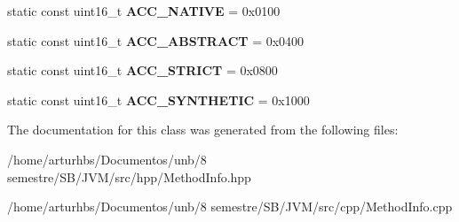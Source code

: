 \begin{DoxyCompactItemize}
\item 
static const uint16\+\_\+t {\bfseries A\+C\+C\+\_\+\+N\+A\+T\+I\+VE} = 0x0100\hypertarget{classMethodInfo_a5be7aad6dd747cb60a059aff7f6bf14c}{}\label{classMethodInfo_a5be7aad6dd747cb60a059aff7f6bf14c}

\item 
static const uint16\+\_\+t {\bfseries A\+C\+C\+\_\+\+A\+B\+S\+T\+R\+A\+CT} = 0x0400\hypertarget{classMethodInfo_a220d90f2bc05772aed488b598ec54d94}{}\label{classMethodInfo_a220d90f2bc05772aed488b598ec54d94}

\item 
static const uint16\+\_\+t {\bfseries A\+C\+C\+\_\+\+S\+T\+R\+I\+CT} = 0x0800\hypertarget{classMethodInfo_a83b3d5b0225d1a35d90f5fe3571e7a59}{}\label{classMethodInfo_a83b3d5b0225d1a35d90f5fe3571e7a59}

\item 
static const uint16\+\_\+t {\bfseries A\+C\+C\+\_\+\+S\+Y\+N\+T\+H\+E\+T\+IC} = 0x1000\hypertarget{classMethodInfo_adbdfc13db237a1860763d0f795bdf2d0}{}\label{classMethodInfo_adbdfc13db237a1860763d0f795bdf2d0}

\end{DoxyCompactItemize}


The documentation for this class was generated from the following files\+:\begin{DoxyCompactItemize}
\item 
/home/arturhbs/\+Documentos/unb/8 semestre/\+S\+B/\+J\+V\+M/src/hpp/Method\+Info.\+hpp\item 
/home/arturhbs/\+Documentos/unb/8 semestre/\+S\+B/\+J\+V\+M/src/cpp/Method\+Info.\+cpp\end{DoxyCompactItemize}
